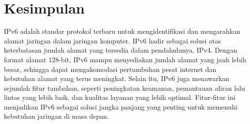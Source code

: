 \section*{Kesimpulan}

IPv6 adalah standar protokol terbaru untuk mengidentifikasi dan mengarahkan alamat jaringan dalam jaringan komputer. IPv6 hadir sebagai solusi atas keterbatasan jumlah alamat yang tersedia dalam pendahulunya, IPv4. Dengan format alamat 128-bit, IPv6 mampu menyediakan jumlah alamat yang jauh lebih besar, sehingga dapat mengakomodasi pertumbuhan pesat internet dan kebutuhan alamat yang terus meningkat. Selain itu, IPv6 juga menawarkan sejumlah fitur tambahan, seperti peningkatan keamanan, pemantauan aliran lalu lintas yang lebih baik, dan kualitas layanan yang lebih optimal. Fitur-fitur ini menjadikan IPv6 sebagai solusi jangka panjang yang penting untuk memenuhi kebutuhan jaringan di masa depan.